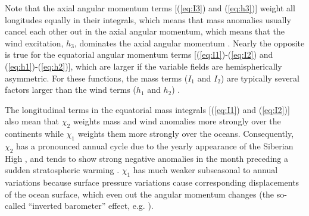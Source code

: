 Note that the axial angular momentum terms [(\ref{eq:I3}) and (\ref{eq:h3})] weight all longitudes equally in their integrals, which means that mass anomalies usually cancel each other out in the axial angular momentum, which means that the wind excitation, $h_3$, dominates the axial angular momentum  \citep{barnesetal1983}.
%
Nearly the opposite is true for the equatorial angular momentum terms [(\ref{eq:I1})-(\ref{eq:I2}) and (\ref{eq:h1})-(\ref{eq:h2})], which are larger if the variable fields are hemispherically asymmetric.
For these functions, the mass terms ($I_1$ and $I_2$) are typically several factors larger than the wind terms ($h_1$ and $h_2$)  \citep{barnesetal1983}.

The longitudinal terms in the equatorial mass integrals [(\ref{eq:I1}) and (\ref{eq:I2})] also mean that $\chi_2$ weights mass and wind anomalies more strongly over the continents while $\chi_1$ weights them more strongly over the oceans.
Consequently, $\chi_2$ has a pronounced annual cycle due to the yearly appearance of the Siberian High \citep{dobslawetal2010}, and tends to show strong negative anomalies in the month preceding a sudden stratospheric warming \citep{Neef2014}.
$\chi_1$ has much weaker subseasonal to annual variations because surface pressure variations cause corresponding displacements of the ocean surface, which even out the angular momentum changes (the so-called ``inverted barometer'' effect, e.g. \citet{salsteinrosen1989}).

